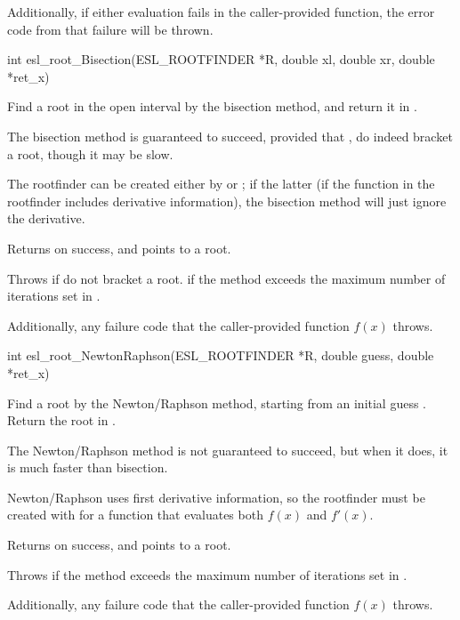 \begin{sreapi}
Additionally, if either evaluation fails in the
caller-provided function, the error code from that
failure will be thrown.


\hypertarget{func:esl_root_Bisection()}
{\item[int esl\_root\_Bisection(ESL\_ROOTFINDER *R, double xl, double xr, double *ret\_x)]}

Find a root in the open interval  by the bisection method,
and return it in . 

The bisection method is guaranteed to succeed, provided
that , do indeed bracket a root, though it may
be slow.

The rootfinder  can be created either by
 or
; if the latter (if the
function in the rootfinder  includes derivative
information), the bisection method will just ignore
the derivative. 

Returns  on success, and  points to a root.

Throws  if  do not bracket a root. 
 if the method exceeds the maximum number of
iterations set in . 

Additionally, any failure code that the caller-provided
function $f(x)$ throws.


\hypertarget{func:esl_root_NewtonRaphson()}
{\item[int esl\_root\_NewtonRaphson(ESL\_ROOTFINDER *R, double guess, double *ret\_x)]}

Find a root by the Newton/Raphson method, starting from
an initial guess . Return the root in .

The Newton/Raphson method is not guaranteed to succeed,
but when it does, it is much faster than bisection.

Newton/Raphson uses first derivative information, so the
rootfinder  must be created with
 for a function that evaluates
both $f(x)$ and $f'(x)$.

Returns  on success, and  points to a root.

Throws  if the method exceeds the maximum number of
iterations set in . 

Additionally, any failure code that the caller-provided
function $f(x)$ throws.


\end{sreapi}

